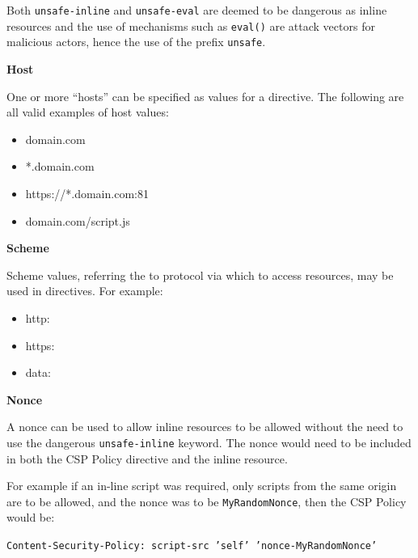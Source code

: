 \documentclass{mscreport}
\begin{document}
\noindent
Both \texttt{unsafe-inline} and \texttt{unsafe-eval} are deemed to be dangerous as inline resources and the use of mechanisms such as \texttt{eval()} are attack vectors for malicious actors, hence the use of the prefix \texttt{unsafe}.

\vspace{0.7cm} \noindent
\textbf{Host}

\vspace{0.3cm} \noindent
One or more ``hosts'' can be specified as values for a directive. The following are all valid examples of host values:
\begin{itemize}
	\setlength\itemsep{0.1em}
	\item domain.com
	\item *.domain.com
	\item https://*.domain.com:81
	\item domain.com/script.js
\end{itemize}

\vspace{0.5cm} \noindent
\textbf{Scheme}

\vspace{0.3cm} \noindent
Scheme values, referring the to protocol via which to access resources, may be used in directives. For example:

\begin{itemize}
	\setlength\itemsep{0.1em}
	\item http:
	\item https:
	\item data:
\end{itemize}

\vspace{0.5cm} \noindent
\textbf{Nonce}

\vspace{0.3cm} \noindent
A nonce can be used to allow inline resources to be allowed without the need to use the dangerous \texttt{unsafe-inline} keyword. The nonce would need to be included in both the CSP Policy directive and the inline resource.

\vspace{0.3cm} \noindent
For example if an in-line script was required, only scripts from the same origin are to be allowed, and the nonce was to be \texttt{MyRandomNonce}, then the CSP Policy would be:

\vspace{0.3cm} \noindent
\texttt{Content-Security-Policy: script-src 'self' 'nonce-MyRandomNonce'}
\end{document}
